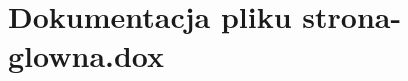 \hypertarget{strona-glowna_8dox}{
\section{Dokumentacja pliku strona-\/glowna.dox}
\label{strona-glowna_8dox}
}
